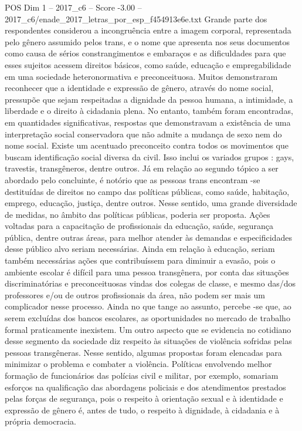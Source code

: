 \begin{textsample}{POS Dim 1 – 2017\_c6 – Score -3.00 – 2017\_c6/enade\_2017\_letras\_por\_esp\_f454913e6e.txt}
Grande parte dos respondentes considerou a incongruência entre a imagem corporal, representada pelo gênero assumido pelos trans, e o nome que apresenta nos seus documentos como causa de sérios constrangimentos e embaraços e as dificuldades para que esses sujeitos acessem direitos básicos, como saúde, educação e empregabilidade em uma sociedade heteronormativa e preconceituosa.
Muitos demonstraram reconhecer que a identidade e expressão de gênero, através do nome social, pressupõe que sejam respeitadas a dignidade da pessoa humana, a intimidade, a liberdade e o direito à cidadania plena.
No entanto, também foram encontradas, em quantidades significativas, respostas que demonstravam a existência de uma interpretação social conservadora que não admite a mudança de sexo nem do nome social.
Existe um acentuado preconceito contra todos os movimentos que buscam identificação social diversa da civil.
Isso inclui os variados grupos : gays, travestis, transgêneros, dentre outros.
Já em relação ao segundo tópico a ser abordado pelo concluinte, é notório que as pessoas trans encontram -se destituídas de direitos no campo das políticas públicas, como saúde, habitação, emprego, educação, justiça, dentre outros.
Nesse sentido, uma grande diversidade de medidas, no âmbito das políticas públicas, poderia ser proposta.
Ações voltadas para a capacitação de profissionais da educação, saúde, segurança pública, dentre outras áreas, para melhor atender às demandas e especificidades desse público alvo seriam necessárias.
Ainda em relação à educação, seriam também necessárias ações que contribuíssem para diminuir a evasão, pois o ambiente escolar é difícil para uma pessoa transgênera, por conta das situações discriminatórias e preconceituosas vindas dos colegas de classe, e mesmo das/dos professores e/ou de outros profissionais da área, não podem ser mais um complicador nesse processo.
Ainda no que tange ao assunto, percebe -se que, ao serem excluídas dos bancos escolares, as oportunidades no mercado de trabalho formal praticamente inexistem.
Um outro aspecto que se evidencia no cotidiano desse segmento da sociedade diz respeito às situações de violência sofridas pelas pessoas transgêneras.
Nesse sentido, algumas propostas foram elencadas para minimizar o problema e combater a violência.
Políticas envolvendo melhor formação de funcionários das polícias civil e militar, por exemplo, somariam esforços na qualificação das abordagens policiais e dos atendimentos prestados pelas forças de segurança, pois o respeito à orientação sexual e à identidade e expressão de gênero é, antes de tudo, o respeito à dignidade, à cidadania e à própria democracia.

\end{textsample}
